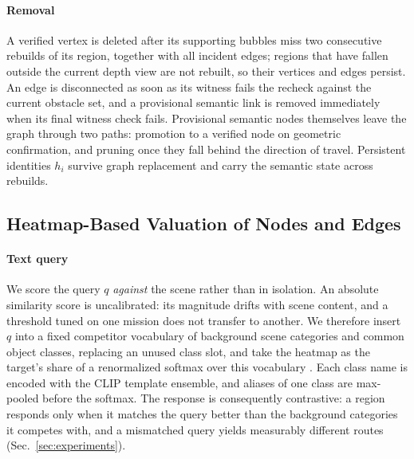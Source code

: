 \documentclass[letterpaper,10pt,conference]{ieeeconf}
\begin{document}
\paragraph{Removal}
A verified vertex is deleted after its supporting bubbles miss two
consecutive rebuilds of its region, together with all incident edges;
regions that have fallen outside the current depth view are not rebuilt,
so their vertices and edges persist.  An edge is
disconnected as soon as its witness fails the recheck against the current
obstacle set, and a provisional semantic link is removed immediately when
its final witness check fails.  Provisional semantic nodes themselves
leave the graph through two paths: promotion to a verified node on
geometric confirmation, and pruning once they fall behind the direction
of travel.
Persistent identities $h_i$ survive graph replacement and carry the
semantic state across rebuilds.

\subsection{Heatmap-Based Valuation of Nodes and Edges}
\label{sec:semantics}
\paragraph{Text query}
We score the query $q$ \emph{against} the scene rather than in
isolation.  An absolute similarity score is uncalibrated: its magnitude
drifts with scene content, and a threshold tuned on one mission does not
transfer to another.  We therefore insert $q$ into a fixed competitor
vocabulary of background scene categories and common object classes,
replacing an unused class slot, and take the heatmap as the target's
share of a renormalized softmax over this vocabulary
\cite{pearl,clip}.  Each class name is encoded with the CLIP template
ensemble, and aliases of one class are max-pooled before the softmax.
The response is consequently contrastive: a region responds only when
it matches the query better than the background categories it competes
with, and a mismatched query yields measurably different routes
(Sec.~\ref{sec:experiments}).
\end{document}
